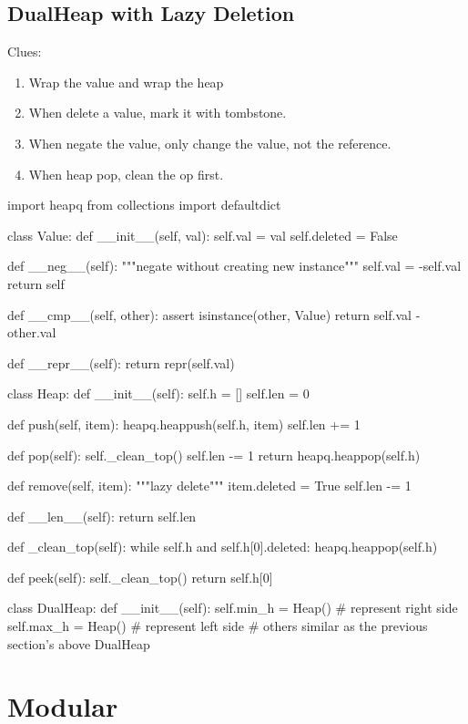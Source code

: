 \subsection{DualHeap with Lazy Deletion}\label{dh_lazy_del}
Clues:
\begin{enumerate}
\item Wrap the value and wrap the heap
\item When delete a value, mark it with tombstone. 
\item When negate the value, only change the value, not the reference. 
\item When heap pop, clean the op first. 
\end{enumerate}
\begin{python}
import heapq
from collections import defaultdict


class Value:
    def __init__(self, val):
        self.val = val
        self.deleted = False

    def __neg__(self):
        """negate without creating new instance"""
        self.val = -self.val
        return self

    def __cmp__(self, other):
        assert isinstance(other, Value)
        return self.val - other.val

    def __repr__(self):
        return repr(self.val)


class Heap:
    def __init__(self):
        self.h = []
        self.len = 0

    def push(self, item):
        heapq.heappush(self.h, item)
        self.len += 1

    def pop(self):
        self._clean_top()
        self.len -= 1
        return heapq.heappop(self.h)

    def remove(self, item):
        """lazy delete"""
        item.deleted = True
        self.len -= 1

    def __len__(self):
        return self.len

    def _clean_top(self):
        while self.h and self.h[0].deleted:
            heapq.heappop(self.h)

    def peek(self):
        self._clean_top()
        return self.h[0]


class DualHeap:
    def __init__(self):
        self.min_h = Heap()  # represent right side
        self.max_h = Heap()  # represent left side
    # others similar as the previous section's above DualHeap
\end{python}

\section{Modular}
